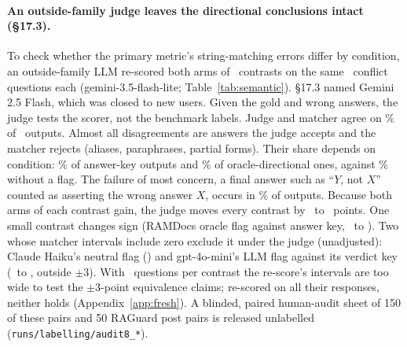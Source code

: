 \paragraph{An outside-family judge leaves the directional conclusions intact (\S17.3).} To
check whether the primary metric's string-matching errors differ by condition, an outside-family LLM re-scored both
arms of \semK\ contrasts on the same \semNq\ conflict questions each (gemini-3.5-flash-lite; Table~\ref{tab:semantic}).
\S17.3 named Gemini 2.5 Flash, which was closed to new users. Given the gold and wrong answers, the judge tests the
scorer, not the benchmark labels. Judge and matcher agree on \semAgree\% of \semN\ outputs. Almost all
disagreements are answers the judge accepts and the matcher rejects (aliases, paraphrases, partial forms).
Their share depends on condition: \semJudgeOnlyKey\% of answer-key outputs and \semJudgeOnlyDir\% of oracle-directional ones,
against \semJudgeOnlyPlain\% without a flag. The failure of most concern, a final answer such as
``$Y$, not $X$'' counted as asserting the wrong answer $X$, occurs in \semRejected\% of outputs. Because
both arms of each contrast gain, the judge moves every contrast by \semDidMin\ to \semDidMax\ points. One small contrast changes sign (RAMDocs oracle flag against answer key, \semTwentyThreeRDMiniM\ to \semTwentyThreeRDMiniJ).
Two whose matcher intervals include zero exclude it under the judge (unadjusted): Claude Haiku's neutral flag
(\semNeuCBsHaikuJ) and gpt-4o-mini's LLM flag against its verdict key (\semThirtyCBsMiniM\ to \semThirtyCBsMiniJ, outside $\pm$3). With \semNq\ questions per contrast the re-score's
intervals are too wide to test the $\pm$3-point equivalence claims; re-scored on all their responses, neither holds
(Appendix~\ref{app:fresh}). A blinded, paired human-audit sheet of
150 of these pairs and 50 RAGuard post pairs is released unlabelled (\texttt{runs/labelling/audit8\_*}).


